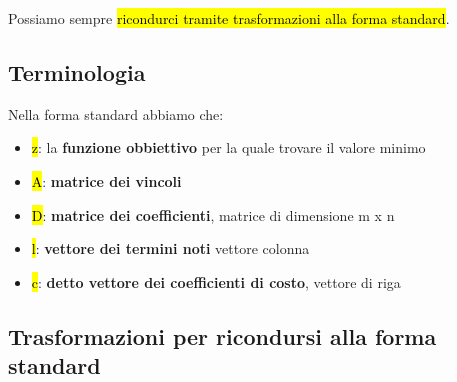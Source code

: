 Possiamo sempre \hl{ricondurci tramite trasformazioni alla forma standard}.


\subsection{Terminologia}

Nella forma standard abbiamo che:

\begin{itemize}
	\item \hl{z}: la \textbf{funzione obbiettivo} per la quale trovare il valore minimo
	\item \hl{A}: \textbf{matrice dei vincoli}
	\item \hl{D}: \textbf{matrice dei coefficienti}, matrice di dimensione m x n
	\item \hl{l}: \textbf{vettore dei termini noti} vettore colonna 
	\item \hl{c}: \textbf{detto vettore dei coefficienti di costo}, vettore di riga
\end{itemize}


\subsection{Trasformazioni per ricondursi alla forma standard}

